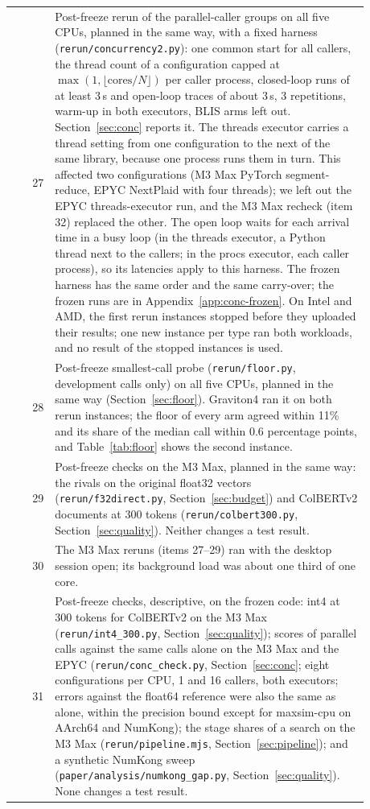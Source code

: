 \begin{small}
\begin{longtable}{rp{0.88\linewidth}}
27 & Post-freeze rerun of the parallel-caller groups on all five CPUs, planned in the same way, with a fixed harness (\texttt{rerun/concurrency2.py}): one common start for all callers, the thread count of a configuration capped at $\max(1, \lfloor\text{cores}/N\rfloor)$ per caller process, closed-loop runs of at least 3\,s and open-loop traces of about 3\,s, 3 repetitions, warm-up in both executors, BLIS arms left out. Section~\ref{sec:conc} reports it. The threads executor carries a thread setting from one configuration to the next of the same library, because one process runs them in turn. This affected two configurations (M3 Max PyTorch segment-reduce, EPYC NextPlaid with four threads); we left out the EPYC threads-executor run, and the M3 Max recheck (item 32) replaced the other. The open loop waits for each arrival time in a busy loop (in the threads executor, a Python thread next to the callers; in the procs executor, each caller process), so its latencies apply to this harness. The frozen harness has the same order and the same carry-over; the frozen runs are in Appendix~\ref{app:conc-frozen}. On Intel and AMD, the first rerun instances stopped before they uploaded their results; one new instance per type ran both workloads, and no result of the stopped instances is used. \\
28 & Post-freeze smallest-call probe (\texttt{rerun/floor.py}, development calls only) on all five CPUs, planned in the same way (Section~\ref{sec:floor}). Graviton4 ran it on both rerun instances; the floor of every arm agreed within 11\% and its share of the median call within 0.6 percentage points, and Table~\ref{tab:floor} shows the second instance. \\
29 & Post-freeze checks on the M3 Max, planned in the same way: the rivals on the original float32 vectors (\texttt{rerun/f32direct.py}, Section~\ref{sec:budget}) and ColBERTv2 documents at 300 tokens (\texttt{rerun/colbert300.py}, Section~\ref{sec:quality}). Neither changes a test result. \\
30 & The M3 Max reruns (items 27--29) ran with the desktop session open; its background load was about one third of one core. \\
31 & Post-freeze checks, descriptive, on the frozen code: int4 at 300 tokens for ColBERTv2 on the M3 Max (\texttt{rerun/int4\_300.py}, Section~\ref{sec:quality}); scores of parallel calls against the same calls alone on the M3 Max and the EPYC (\texttt{rerun/conc\_check.py}, Section~\ref{sec:conc}; eight configurations per CPU, 1 and 16 callers, both executors; errors against the float64 reference were also the same as alone, within the precision bound except for maxsim-cpu on AArch64 and NumKong); the stage shares of a search on the M3 Max (\texttt{rerun/pipeline.mjs}, Section~\ref{sec:pipeline}); and a synthetic NumKong sweep (\texttt{paper/analysis/numkong\_gap.py}, Section~\ref{sec:quality}). None changes a test result. \\

\end{longtable}
\end{small}
